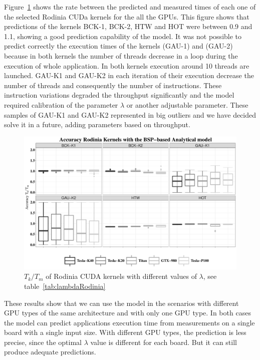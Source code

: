 Figure~\ref{fig:ResultsRodinia} shows the rate between the predicted and measured times of each one of the selected Rodinia CUDa kernels for the all the GPUs. This figure shows that predictions of the kernels BCK-1, BCK-2, HTW and HOT were between 0.9 and 1.1, showing a good prediction capability of the model. It was not possible to predict correctly the execution times of the kernels (GAU-1) and (GAU-2) because in both kernels the number of threads decrease in a loop during the execution of whole application. In both kernels execution around 10 threads are launched. GAU-K1 and GAU-K2 in each iteration of their execution decrease the number of threads and consequently the number of instructions. These instruction variations degraded the throughput significantly and the model required calibration of the parameter $\lambda$ or another adjustable parameter. These samples of GAU-K1 and GAU-K2 represented in big outliers and we have decided solve it in a future, adding parameters based on throughput. 

\begin{figure}[htpb]
\centering
 \includegraphics[scale=.4]{images/ResutAnalyticalModelRodinia.pdf}
\caption{$T_k/T_m$  of Rodinia CUDA kernels with different values of $\lambda$, see table~\ref{tab:lambdaRodinia}}
\label{fig:ResultsRodinia}
\end{figure}


These results show that we can use the model in the scenarios with different GPU types of the same architecture and with only one GPU type. In both cases the model can predict applications execution time from measurements on a single board with a single input size. With different GPU types, the prediction is less precise, since the optimal $\lambda$ value is different for each board. But it can still produce adequate predictions.

